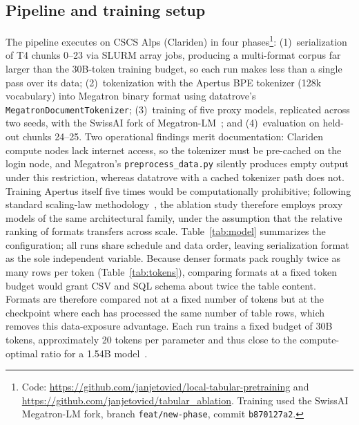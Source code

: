 \documentclass[11pt,a4paper]{article}
\begin{document}
\subsection{Pipeline and training setup}
The pipeline executes on CSCS Alps (Clariden) in four phases\footnote{Code: \url{https://github.com/janjetovicd/local-tabular-pretraining} and \url{https://github.com/janjetovicd/tabular_ablation}. Training used the SwissAI Megatron-LM fork, branch \texttt{feat/new-phase}, commit \texttt{b870127a2}.}: (1)~serialization of T4 chunks 0--23 via SLURM array jobs, producing a multi-format corpus far larger than the 30B-token training budget, so each run makes less than a single pass over its data; (2)~tokenization with the Apertus BPE tokenizer (128k vocabulary) into Megatron binary format using datatrove's \texttt{MegatronDocumentTokenizer}; (3)~training of five proxy models, replicated across two seeds, with the SwissAI fork of Megatron-LM~\cite{megatron}; and (4)~evaluation on held-out chunks 24--25. Two operational findings merit documentation: Clariden compute nodes lack internet access, so the tokenizer must be pre-cached on the login node, and Megatron's \texttt{preprocess\_data.py} silently produces empty output under this restriction, whereas datatrove with a cached tokenizer path does not.
Training Apertus itself five times would be computationally prohibitive; following standard scaling-law methodology~\cite{chinchilla}, the ablation study therefore employs proxy models of the same architectural family, under the assumption that the relative ranking of formats transfers across scale. Table~\ref{tab:model} summarizes the configuration; all runs share schedule and data order, leaving serialization format as the sole independent variable. Because denser formats pack roughly twice as many rows per token (Table~\ref{tab:tokens}), comparing formats at a fixed token budget would grant CSV and SQL schema about twice the table content. Formats are therefore compared not at a fixed number of tokens but at the checkpoint where each has processed the same number of table rows, which removes this data-exposure advantage. Each run trains a fixed budget of 30B tokens, approximately 20 tokens per parameter and thus close to the compute-optimal ratio for a 1.54B model~\cite{chinchilla}.
\end{document}
